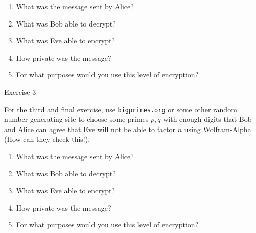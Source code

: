 \documentclass{article}
\begin{document}
    \begin{enumerate}
        \item What was the message sent by Alice? 

            \TextField[width=6in,height=1in, bordercolor=0 0 0, name=p2q1, multiline=true]{}

        \item What was Bob able to decrypt?

            \TextField[width=6in,height=1in, bordercolor=0 0 0, name=p2q2, multiline=true]{}

        \item What was Eve able to encrypt?

            \TextField[width=6in,height=1in, bordercolor=0 0 0, name=p2q3, multiline=true]{}

        \item How private was the message?

            \TextField[width=6in,height=1in, bordercolor=0 0 0, name=p2q4, multiline=true]{}

        \item For what purposes would you use this level of encryption?

            \TextField[width=6in,height=1in, bordercolor=0 0 0, name=p2q5, multiline=true]{}

    \end{enumerate}


    \newpage
    \huge Exercise 3
    \normalsize

    For the third and final exercise, use \verb|bigprimes.org| or some other random number generating site to choose some primes $p,q$ with enough digits that Bob and Alice can agree that Eve will not be able to factor $n$ using Wolfram-Alpha (How can they check this!). 

    \begin{enumerate}
        \item What was the message sent by Alice? 

            \TextField[width=6in,height=1in, bordercolor=0 0 0, name=p3q1, multiline=true]{}

        \item What was Bob able to decrypt?

            \TextField[width=6in,height=1in, bordercolor=0 0 0, name=p3q2, multiline=true]{}

        \item What was Eve able to encrypt?

            \TextField[width=6in,height=1in, bordercolor=0 0 0, name=p3q3, multiline=true]{}

        \item How private was the message?

            \TextField[width=6in,height=1in, bordercolor=0 0 0, name=p3q4, multiline=true]{}

        \item For what purposes would you use this level of encryption?

            \TextField[width=6in,height=1in, bordercolor=0 0 0, name=p3q5, multiline=true]{}

    \end{enumerate}
\end{document}
